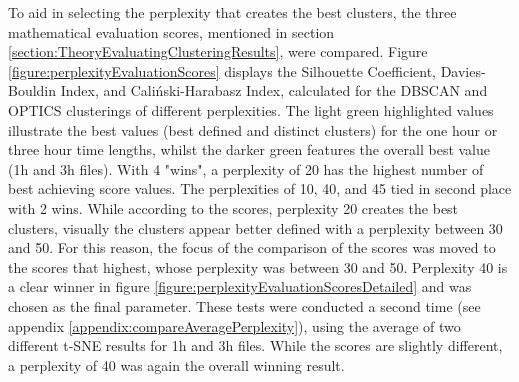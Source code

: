 To aid in selecting the perplexity that creates the best clusters, the three mathematical evaluation scores, mentioned in section \ref{section:TheoryEvaluatingClusteringResults}, were compared. Figure \ref{figure:perplexityEvaluationScores} displays the Silhouette Coefficient, Davies-Bouldin Index, and Caliński-Harabasz Index, calculated for the DBSCAN and OPTICS clusterings of different perplexities. The light green highlighted values illustrate the best values (best defined and distinct clusters) for the one hour or three hour time lengths, whilst the darker green features the overall best value (1h and 3h files). With 4 "wins", a perplexity of 20 has the highest number of best achieving score values. The perplexities of 10, 40, and 45 tied in second place with 2 wins. While according to the scores, perplexity 20 creates the best clusters, visually the clusters appear better defined with a perplexity between 30 and 50.  For this reason, the focus of the comparison of the scores was moved to the scores that highest, whose perplexity was between 30 and 50. Perplexity 40 is a clear winner in figure \ref{figure:perplexityEvaluationScoresDetailed} and was chosen as the final parameter. These tests were conducted a second time (see appendix \ref{appendix:compareAveragePerplexity}), using the average of two different t-SNE results for 1h and 3h files. While the scores are slightly different, a perplexity of 40 was again the overall winning result.



